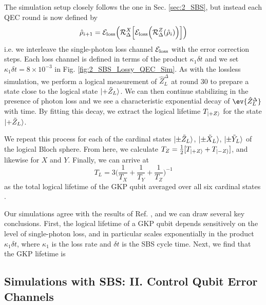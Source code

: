 The simulation setup closely follows the one in Sec. \ref{sec:2_SBS}, but instead each QEC round is now defined by
\begin{equation}
    \hat{\rho}_{i + 1} =  \mathcal{E}_{\rm loss}\Big(\mathcal{R}_\Delta^X\Big[\mathcal{E}_{\rm loss}\Big(\mathcal{R}_\Delta^Z(\hat{\rho}_i)\Big)\Big]\Big)
\end{equation}
i.e. we interleave the single-photon loss channel $\mathcal{E}_{\rm loss}$ with the error correction steps. Each loss channel is defined in terms of the product $\kappa_1 \delta t$ and we set $\kappa_1 \delta t = 8 \times 10^{-3}$ in Fig. \ref{fig:2_SBS_Lossy_QEC_Sim}. As with the lossless simulation, we perform a logical measurement of $\hat{Z}_L^\Delta$ at round 30 to prepare a state close to the logical state $\lvert+\tilde{Z}_L\rangle$. We can then continue stabilizing in the presence of photon loss and we see a characteristic exponential decay of $\ev{\hat{Z}_L^\Delta}$ with time. By fitting this decay, we extract the logical lifetime $T_{\lvert+Z\rangle}$ for the state $\lvert+\tilde{Z}_L\rangle$. 

We repeat this process for each of the cardinal states $\lvert\pm \tilde{Z}_L\rangle$, $\lvert\pm \tilde{X}_L\rangle$, $\lvert\pm \tilde{Y}_L\rangle$ of the logical Bloch sphere. From here, we calculate $T_Z = \frac{1}{2}[T_{\lvert+Z\rangle} + T_{\lvert-Z\rangle}]$, and likewise for $X$ and $Y$. Finally, we can arrive at
\begin{equation}
    T_L = 3\bigg(\frac{1}{T_X} + \frac{1}{T_Y} + \frac{1}{T_Z}\bigg)^{-1}
\end{equation}
as the total logical lifetime of the GKP qubit averaged over all six cardinal states \cite{royer2020gkp, sivak2023gkp-expt}. 


Our simulations agree with the results of Ref. \cite{royer2020gkp}, and we can draw several key conclusions. First, the logical lifetime of a GKP qubit depends sensitively on the level of single-photon loss, and in particular scales exponentially in the product $\kappa_1\delta t$, where $\kappa_1$ is the loss rate and $\delta t$ is the SBS cycle time. Next, we find that the GKP lifetime is  



\subsection{Simulations with SBS: II. Control Qubit Error Channels}


